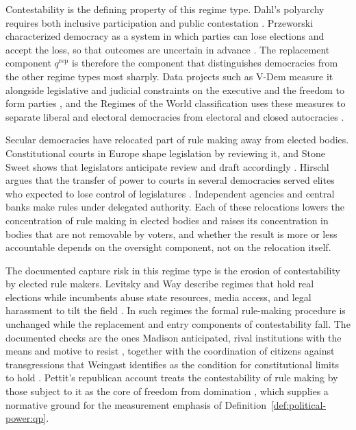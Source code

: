 \documentclass[11pt,letterpaper]{article}
\theoremstyle{definition}
\theoremstyle{remark}
\begin{document}
Contestability is the defining property of this regime type. Dahl's polyarchy requires both inclusive participation and public contestation \citep{dahl1971}. Przeworski characterized democracy as a system in which parties can lose elections and accept the loss, so that outcomes are uncertain in advance \citep{przeworski1991}. The replacement component $q^{\mathrm{rep}}$ is therefore the component that distinguishes democracies from the other regime types most sharply. Data projects such as V-Dem measure it alongside legislative and judicial constraints on the executive and the freedom to form parties \citep{coppedge2011}, and the Regimes of the World classification uses these measures to separate liberal and electoral democracies from electoral and closed autocracies \citep{luhrmann2018}.

Secular democracies have relocated part of rule making away from elected bodies. Constitutional courts in Europe shape legislation by reviewing it, and Stone Sweet shows that legislators anticipate review and draft accordingly \citep{stonesweet2000}. Hirschl argues that the transfer of power to courts in several democracies served elites who expected to lose control of legislatures \citep{hirschl2004}. Independent agencies and central banks make rules under delegated authority. Each of these relocations lowers the concentration of rule making in elected bodies and raises its concentration in bodies that are not removable by voters, and whether the result is more or less accountable depends on the oversight component, not on the relocation itself.

The documented capture risk in this regime type is the erosion of contestability by elected rule makers. Levitsky and Way describe regimes that hold real elections while incumbents abuse state resources, media access, and legal harassment to tilt the field \citep{levitsky2010}. In such regimes the formal rule-making procedure is unchanged while the replacement and entry components of contestability fall. The documented checks are the ones Madison anticipated, rival institutions with the means and motive to resist \citep{madison1788}, together with the coordination of citizens against transgressions that Weingast identifies as the condition for constitutional limits to hold \citep{weingast1997}. Pettit's republican account treats the contestability of rule making by those subject to it as the core of freedom from domination \citep{pettit1997}, which supplies a normative ground for the measurement emphasis of Definition~\ref{def:political-power:qp}.
\end{document}

